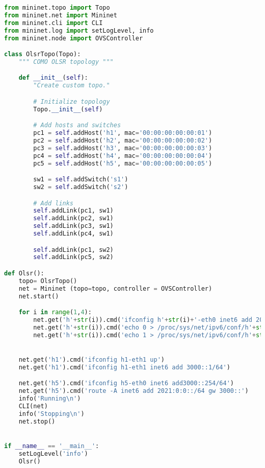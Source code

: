 \begin{lstlisting}[language=Python, label=py_script, basicstyle=\fontsize{10.5}{12.5}\selectfont]
from mininet.topo import Topo
from mininet.net import Mininet
from mininet.cli import CLI
from mininet.log import setLogLevel, info
from mininet.node import OVSController

class OlsrTopo(Topo):
	""" COMO OLSR topology """

	def __init__(self):
		"Create custom topo."

		# Initialize topology
		Topo.__init__(self)

		# Add hosts and switches
		pc1 = self.addHost('h1', mac='00:00:00:00:00:01')
		pc2 = self.addHost('h2', mac='00:00:00:00:00:02')
		pc3 = self.addHost('h3', mac='00:00:00:00:00:03')
		pc4 = self.addHost('h4', mac='00:00:00:00:00:04')
		pc5 = self.addHost('h5', mac='00:00:00:00:00:05')

		sw1 = self.addSwitch('s1')
		sw2 = self.addSwitch('s2')

		# Add links
		self.addLink(pc1, sw1)
		self.addLink(pc2, sw1)
		self.addLink(pc3, sw1)
		self.addLink(pc4, sw1)

		self.addLink(pc1, sw2)
		self.addLink(pc5, sw2)

def Olsr():
	topo= OlsrTopo()
	net = Mininet (topo=topo, controller = OVSController)
	net.start()

	for i in range(1,4):
		net.get('h'+str(i)).cmd('ifconfig h'+str(i)+'-eth0 inet6 add 2021::'+str(i)+'/128')
		net.get('h'+str(i)).cmd('echo 0 > /proc/sys/net/ipv6/conf/h'+str(i)+'-eth0/accept_ra')
		net.get('h'+str(i)).cmd('echo 1 > /proc/sys/net/ipv6/conf/h'+str(i)+'-eth0/forwarding')


	net.get('h1').cmd('ifconfig h1-eth1 up')
	net.get('h1').cmd('ifconfig h1-eth1 inet6 add 3000::1/64')

	net.get('h5').cmd('ifconfig h5-eth0 inet6 add3000::254/64')
	net.get('h5').cmd('route -A inet6 add 2021:0:0::/64 gw 3000::')
	info('Running\n')
	CLI(net)
	info('Stopping\n')
	net.stop()


if __name__ == '__main__':
	setLogLevel('info')
	Olsr()

\end{lstlisting}